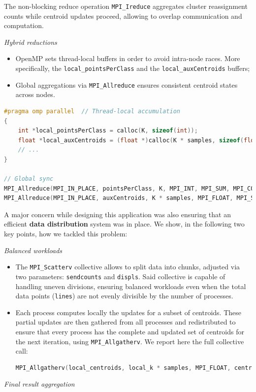 \documentclass[11pt, journal]{IEEEtran}
\newcommand{\nwl}{

\vspace{11pt}

}
\begin{document}
The non-blocking reduce operation \texttt{MPI\_Ireduce} aggregates cluster reassignment counts while centroid updates proceed, allowing to overlap communication and computation.
\nwl
\noindent \textit{Hybrid reductions}
\begin{itemize}
    \item OpenMP sets thread-local buffers in order to avoid intra-node races. More specifically, the \texttt{local\_pointsPerClass} and the \texttt{local\_auxCentroids} buffers;
    \item Global aggregations via \texttt{MPI\_Allreduce} ensures consistent centroid states across nodes.
\end{itemize}
\nwl
\begin{lstlisting}[language=C]
#pragma omp parallel  // Thread-local accumulation
{ 
    int *local_pointsPerClass = calloc(K, sizeof(int)); 
    float *local_auxCentroids = (float *)calloc(K * samples, sizeof(float));
    // ...
}

// Global sync
MPI_Allreduce(MPI_IN_PLACE, pointsPerClass, K, MPI_INT, MPI_SUM, MPI_COMM_WORLD); 
MPI_Allreduce(MPI_IN_PLACE, auxCentroids, K * samples, MPI_FLOAT, MPI_SUM, MPI_COMM_WORLD);\end{lstlisting}
\nwl
A major concern while designing this application was also ensuring that an efficient \textbf{data distribution} system was in place. We show, in the following two key points, how we tackled this problem:
\nwl
\noindent \textit{Balanced workloads}
\begin{itemize}
    \item The \texttt{MPI\_Scatterv} collective allows to split data into chunks, adjusted via two parameters: \texttt{sendcounts} and \texttt{displs}. Said collective is capable of handling uneven divisions, ensuring balanced workloads even when the total data points (\texttt{lines}) are not evenly divisible by the number of processes.
    \item Each process computes locally the updates for a subset of centroids. These partial updates are then gathered from all processes and redistributed to ensure that every process has the complete and updated set of centroids for the next iteration, using \texttt{MPI\_Allgatherv}. We report here the full collective call:
\begin{lstlisting}[language = C]
MPI_Allgatherv(local_centroids, local_k * samples, MPI_FLOAT, centroids, centroid_sendcounts, centroid_displs, MPI_FLOAT, MPI_COMM_WORLD);
\end{lstlisting}
\end{itemize}
\nwl
\noindent \textit{Final result aggregation}
\end{document}
